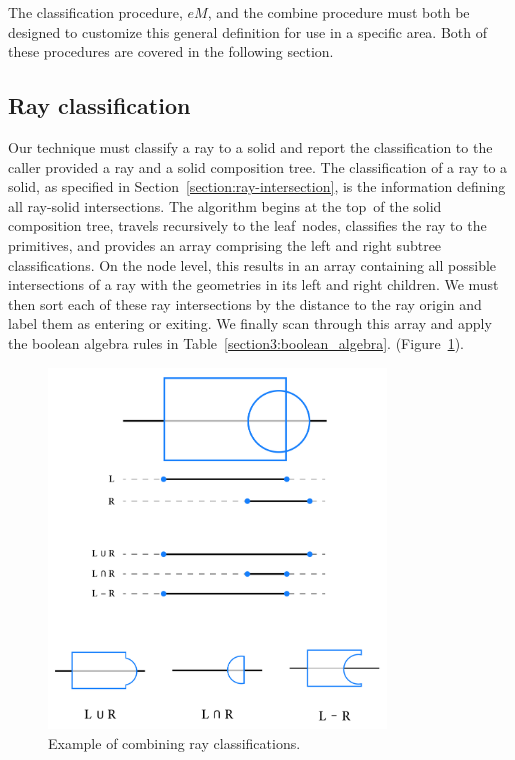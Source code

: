 \documentclass[a4paper,11pt,oneside]{article}
\begin{document}
The classification procedure, $eM$, and the combine procedure must both be designed to customize this general definition for use in a specific area. Both of these procedures are covered in the following section.

\subsection{Ray classification}
\label{sec3.3:ray-classification}

Our technique must classify a ray to a solid and report the classification to the caller provided a ray and a solid composition tree. The classification of a ray to a solid, as specified in Section~\ref{section:ray-intersection}, is the information defining all ray-solid intersections. The algorithm begins at the top of the solid composition tree, travels recursively to the leaf nodes, classifies the ray to the primitives, and provides an array comprising the left and right subtree classifications. On the node level, this results in an array containing all possible intersections of a ray with the geometries in its left and right children. We must then sort each of these ray intersections by the distance to the ray origin and label them as entering or exiting. We finally scan through this array and apply the boolean algebra rules in Table~\ref{section3:boolean_algebra}. (Figure~\ref{sec3.3:classification}).
\begin{figure}[ht]
	\begin{center}
		\includegraphics[width=0.8\textwidth]{section3/3.3/ray-classifications.png}
	\end{center}
	\caption{Example of combining ray classifications.}
	\label{sec3.3:classification}
\end{figure}
\end{document}
